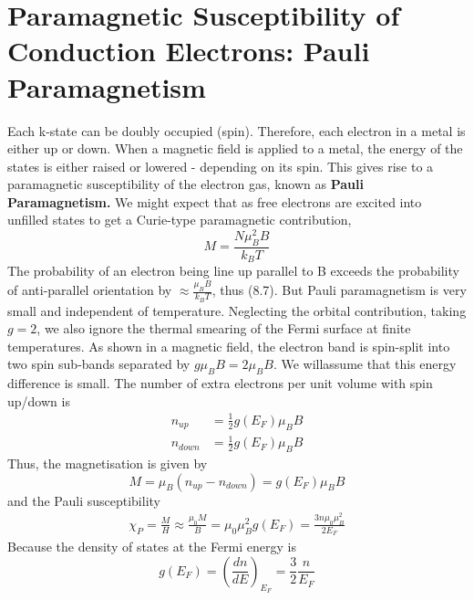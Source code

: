\documentclass[a4paper, 11pt, normalem]{report}
\begin{document}
\section{Paramagnetic Susceptibility of Conduction Electrons: Pauli Paramagnetism}
Each k-state can be doubly occupied (spin).
Therefore, each electron in a metal is either up or down. 
When a magnetic field is applied to a metal, the energy of the states is either raised or lowered - depending on its spin.
This gives rise to a paramagnetic susceptibility of the electron gas, known as \textbf{Pauli Paramagnetism.}
We might expect that as free electrons are excited into unfilled states to get a Curie-type paramagnetic contribution,
\begin{equation}
    M = \frac{N\mu_B^2B}{k_BT}
\end{equation}
The probability of an electron being line up parallel to B exceeds the probability of anti-parallel orientation by $\approx \frac{\mu_BB}{k_BT}$, thus (8.7).
But Pauli paramagnetism is very small and independent of temperature.
Neglecting the orbital contribution, taking $g=2$, we also ignore the thermal smearing of the Fermi surface at finite temperatures. 
As shown in a magnetic field, the electron band is spin-split into two spin sub-bands separated by $g\mu_BB = 2\mu_BB$.
We willassume that this energy difference is small. 
The number of extra electrons per unit volume with spin up/down is 
\begin{align}
    n_{up} &= \frac12 g(E_F)\mu_BB \\
    n_{down} &= \frac12 g(E_F)\mu_BB
\end{align}
Thus, the magnetisation is given by
\begin{equation}
    M = \mu_B(n_{up} - n_{down}) = g(E_F)\mu_BB
\end{equation}
and the Pauli susceptibility
\begin{align}
    \chi_P = \frac{M}{H} \approx \frac{\mu_0M}{B} = \mu_0\mu_B^2g(E_F) = \frac{3n\mu_0\mu_B^2}{2E_F}
\end{align}
Because the density of states at the Fermi energy is
\begin{equation}
    g(E_F) = \left(\frac{dn}{dE}\right)_{E_F} = \frac32\frac{n}{E_F}
\end{equation}
\end{document}
